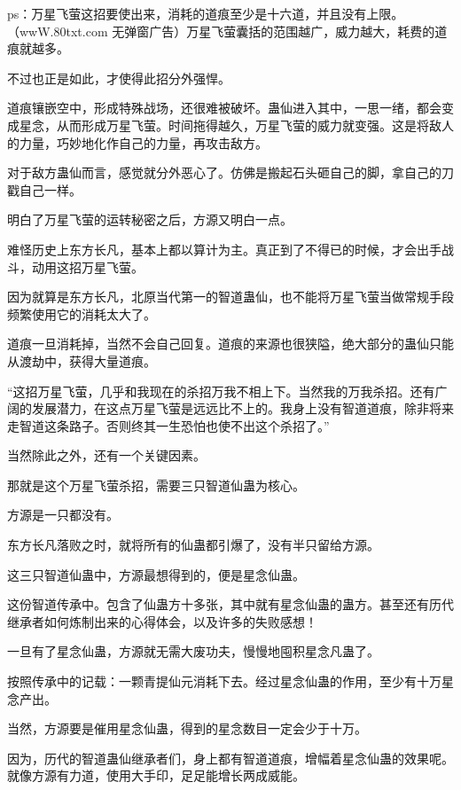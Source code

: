 
\begin{this_body}

ps：万星飞萤这招要使出来，消耗的道痕至少是十六道，并且没有上限。（wwW.80txt.com 无弹窗广告）万星飞萤囊括的范围越广，威力越大，耗费的道痕就越多。

不过也正是如此，才使得此招分外强悍。

道痕镶嵌空中，形成特殊战场，还很难被破坏。蛊仙进入其中，一思一绪，都会变成星念，从而形成万星飞萤。时间拖得越久，万星飞萤的威力就变强。这是将敌人的力量，巧妙地化作自己的力量，再攻击敌方。

对于敌方蛊仙而言，感觉就分外恶心了。仿佛是搬起石头砸自己的脚，拿自己的刀戳自己一样。

明白了万星飞萤的运转秘密之后，方源又明白一点。

难怪历史上东方长凡，基本上都以算计为主。真正到了不得已的时候，才会出手战斗，动用这招万星飞萤。

因为就算是东方长凡，北原当代第一的智道蛊仙，也不能将万星飞萤当做常规手段频繁使用它的消耗太大了。

道痕一旦消耗掉，当然不会自己回复。道痕的来源也很狭隘，绝大部分的蛊仙只能从渡劫中，获得大量道痕。

“这招万星飞萤，几乎和我现在的杀招万我不相上下。当然我的万我杀招。还有广阔的发展潜力，在这点万星飞萤是远远比不上的。我身上没有智道道痕，除非将来走智道这条路子。否则终其一生恐怕也使不出这个杀招了。”

当然除此之外，还有一个关键因素。

那就是这个万星飞萤杀招，需要三只智道仙蛊为核心。

方源是一只都没有。

东方长凡落败之时，就将所有的仙蛊都引爆了，没有半只留给方源。

这三只智道仙蛊中，方源最想得到的，便是星念仙蛊。

这份智道传承中。包含了仙蛊方十多张，其中就有星念仙蛊的蛊方。甚至还有历代继承者如何炼制出来的心得体会，以及许多的失败感想！

一旦有了星念仙蛊，方源就无需大废功夫，慢慢地囤积星念凡蛊了。

按照传承中的记载：一颗青提仙元消耗下去。经过星念仙蛊的作用，至少有十万星念产出。

当然，方源要是催用星念仙蛊，得到的星念数目一定会少于十万。

因为，历代的智道蛊仙继承者们，身上都有智道道痕，增幅着星念仙蛊的效果呢。就像方源有力道，使用大手印，足足能增长两成威能。


\end{this_body}
